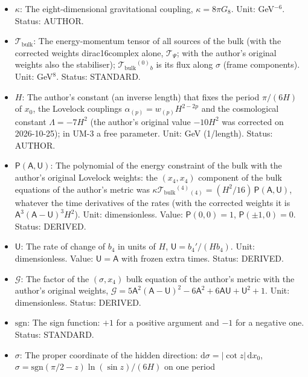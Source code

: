 \documentclass[
  10pt,
]{article}
\providecommand{\tightlist}{%
  \setlength{\itemsep}{0pt}\setlength{\parskip}{0pt}}
\begin{document}
\begin{itemize}
\tightlist
\item
  \(\kappa\): The eight-dimensional gravitational coupling,
  \(\kappa = 8\pi G_8\). Unit: GeV\(^{-6}\). Status: AUTHOR.
\item
  \(\mathcal{T}_{\mathrm{bulk}}\): The energy-momentum tensor of all
  sources of the bulk (with the corrected weights dirac16complex alone,
  \(\mathcal{T}_\Psi\); with the author's original weights also the
  stabiliser); \(\mathcal{T}_{\mathrm{bulk}}{}^{(0)}{}_b\) is its flux
  along \(\sigma\) (frame components). Unit: GeV\(^8\). Status:
  STANDARD.
\item
  \(H\): The author's constant (an inverse length) that fixes the period
  \(\pi/(6H)\) of \(x_0\), the Lovelock couplings
  \(\alpha_{(p)} = w_{(p)}H^{2-2p}\) and the cosmological constant
  \(\Lambda = -7H^2\) (the author's original value \(-10H^2\) was
  corrected on 2026-10-25); in UM-3 a free parameter. Unit: GeV
  (1/length). Status: AUTHOR.
\item
  \(\mathsf{P}(\mathsf{A}, \mathsf{U})\): The polynomial of the energy
  constraint of the bulk with the author's original Lovelock weights:
  the \((x_4, x_4)\) component of the bulk equations of the author's
  metric was
  \(\kappa\mathcal{T}_{\mathrm{bulk}}{}^{(4)}{}_{(4)} = (H^2/16)\,\mathsf{P}(\mathsf{A}, \mathsf{U})\),
  whatever the time derivatives of the rates (with the corrected weights
  it is \(\mathsf{A}^3(\mathsf{A} - \mathsf{U})^3H^2\)). Unit:
  dimensionless. Value: \(\mathsf{P}(0, 0) = 1\),
  \(\mathsf{P}(\pm1, 0) = 0\). Status: DERIVED.
\item
  \(\mathsf{U}\): The rate of change of \(b_4\) in units of \(H\),
  \(\mathsf{U} = b_4'/(Hb_4)\). Unit: dimensionless. Value:
  \(\mathsf{U} = \mathsf{A}\) with frozen extra times. Status: DERIVED.
\item
  \(\mathcal{G}\): The factor of the \((\sigma, x_4)\) bulk equation of
  the author's metric with the author's original weights,
  \(\mathcal{G} = 5\mathsf{A}^2(\mathsf{A} - \mathsf{U})^2 - 6\mathsf{A}^2 + 6\mathsf{A}\mathsf{U} + \mathsf{U}^2 + 1\).
  Unit: dimensionless. Status: DERIVED.
\item
  \(\mathrm{sgn}\): The sign function: \(+1\) for a positive argument
  and \(-1\) for a negative one. Status: STANDARD.
\item
  \(\sigma\): The proper coordinate of the hidden direction:
  \(\mathrm{d}\sigma = \lvert\cot z\rvert\,\mathrm{d}x_0\),
  \(\sigma = \mathrm{sgn}(\pi/2 - z)\ln(\sin z)/(6H)\) on one period

\end{itemize}
\end{document}
